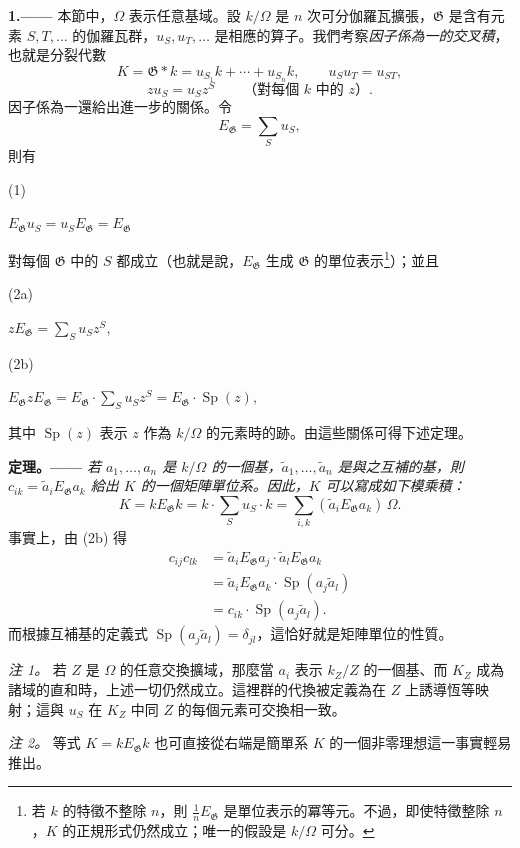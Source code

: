 \documentclass[11pt]{article}
\providecommand{\Gg}{\mathfrak G}
\providecommand{\Sp}{\operatorname{Sp}}
\providecommand{\srcnumdisplay}[3][3.4em]{%
  \par\smallskip\noindent
  \begin{minipage}[t]{#1}\vspace*{0pt}#2\end{minipage}%
  \begin{minipage}[t]{\dimexpr\linewidth-#1\relax}\vspace*{0pt}\centering
  \(\displaystyle #3\)
  \end{minipage}\par\smallskip}
\begin{document}
\noindent\textbf{1.——} 本節中，\(\Omega\) 表示任意基域。設 \(k/\Omega\) 是 \(n\) 次可分伽羅瓦擴張，\(\Gg\) 是含有元素 \(S,T,\ldots\) 的伽羅瓦群，\(u_S,u_T,\ldots\) 是相應的算子。我們考察\emph{因子係為一的交叉積}，也就是分裂代數
\[
K=\Gg\ast k=u_{S_1}k+\cdots+u_{S_n}k,
\qquad u_Su_T=u_{ST},
\]
\[
zu_S=u_Sz^S\qquad\text{（對每個 \(k\) 中的 \(z\)）}.
\]
因子係為一還給出進一步的關係。令
\[
E_\Gg=\sum_Su_S,
\]
則有
\srcnumdisplay{(1)}{E_\Gg u_S=u_SE_\Gg=E_\Gg}
對每個 \(\Gg\) 中的 \(S\) 都成立（也就是說，\(E_\Gg\) 生成 \(\Gg\) 的單位表示\footnote{若 \(k\) 的特徵不整除 \(n\)，則 \(\frac1nE_\Gg\) 是單位表示的冪等元。不過，即使特徵整除 \(n\)，\(K\) 的正規形式仍然成立；唯一的假設是 \(k/\Omega\) 可分。}）；並且
\srcnumdisplay{(2a)}{zE_\Gg=\sum_Su_Sz^S,}
\srcnumdisplay{(2b)}{E_\Gg zE_\Gg=E_\Gg\cdot\sum_Su_Sz^S
  =E_\Gg\cdot\Sp(z),}
其中 \(\Sp(z)\) 表示 \(z\) 作為 \(k/\Omega\) 的元素時的跡。由這些關係可得下述定理。

\medskip
\noindent\textbf{定理。——} \emph{若 \(a_1,\ldots,a_n\) 是 \(k/\Omega\) 的一個基，\(\widetilde a_1,\ldots,\widetilde a_n\) 是與之互補的基，則
\(c_{ik}=\widetilde a_iE_\Gg a_k\) 給出 \(K\) 的一個矩陣單位系。因此，\(K\) 可以寫成如下模乘積：}
\[
K=kE_\Gg k=k\cdot\sum_Su_S\cdot k
 =\sum_{i,k}(\widetilde a_iE_\Gg a_k)\,\Omega.
\]
事實上，由 (2b) 得
\[
\begin{aligned}
c_{ij}c_{lk}
 &=\widetilde a_iE_\Gg a_j\cdot\widetilde a_lE_\Gg a_k\\
 &=\widetilde a_iE_\Gg a_k\cdot\Sp(a_j\widetilde a_l)\\
 &=c_{ik}\cdot\Sp(a_j\widetilde a_l).
\end{aligned}
\]
而根據互補基的定義式 \(\Sp(a_j\widetilde a_l)=\delta_{jl}\)，這恰好就是矩陣單位的性質。

\emph{注 1。} 若 \(Z\) 是 \(\Omega\) 的任意交換擴域，那麼當 \(a_i\) 表示 \(k_Z/Z\) 的一個基、而 \(K_Z\) 成為諸域的直和時，上述一切仍然成立。這裡群的代換被定義為在 \(Z\) 上誘導恆等映射；這與 \(u_S\) 在 \(K_Z\) 中同 \(Z\) 的每個元素可交換相一致。

\emph{注 2。} 等式 \(K=kE_\Gg k\) 也可直接從右端是簡單系 \(K\) 的一個非零理想這一事實輕易推出。
\end{document}
